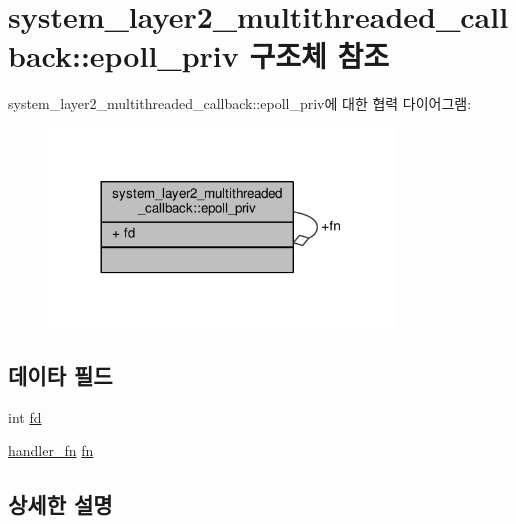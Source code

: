 \hypertarget{structavdecc__lib_1_1system__layer2__multithreaded__callback_1_1epoll__priv}{}\section{system\+\_\+layer2\+\_\+multithreaded\+\_\+callback\+:\+:epoll\+\_\+priv 구조체 참조}
\label{structavdecc__lib_1_1system__layer2__multithreaded__callback_1_1epoll__priv}


system\+\_\+layer2\+\_\+multithreaded\+\_\+callback\+:\+:epoll\+\_\+priv에 대한 협력 다이어그램\+:
\nopagebreak
\begin{figure}[H]
\begin{center}
\leavevmode
\includegraphics[width=260pt]{structavdecc__lib_1_1system__layer2__multithreaded__callback_1_1epoll__priv__coll__graph}
\end{center}
\end{figure}
\subsection*{데이타 필드}
\begin{DoxyCompactItemize}
\item 
int \hyperlink{structavdecc__lib_1_1system__layer2__multithreaded__callback_1_1epoll__priv_a6f8059414f0228f0256115e024eeed4b}{fd}
\item 
\hyperlink{classavdecc__lib_1_1system__layer2__multithreaded__callback_aead26f50f9ac63097d31fcf8235ad693}{handler\+\_\+fn} \hyperlink{structavdecc__lib_1_1system__layer2__multithreaded__callback_1_1epoll__priv_ad4c759f5c520fa14ebae42bb93f0091b}{fn}
\end{DoxyCompactItemize}


\subsection{상세한 설명}


